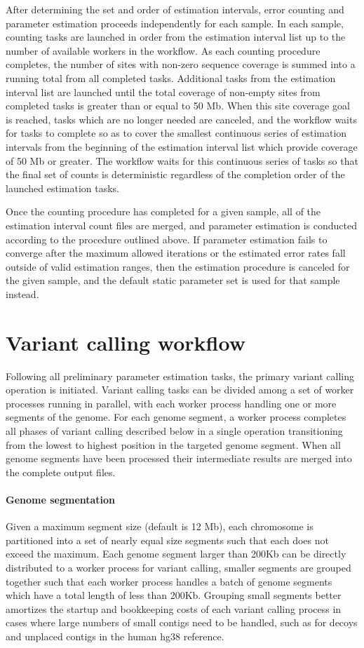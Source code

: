 \documentclass{article}
\begin{document}
After determining the set and order of estimation intervals, error counting and parameter estimation proceeds independently for each sample. In each sample, counting tasks are launched in order from the estimation interval list up to the number of available workers in the workflow. As each counting procedure completes, the number of sites with non-zero sequence coverage is summed into a running total from all completed tasks. Additional tasks from the estimation interval list are launched until the total coverage of non-empty sites from completed tasks is greater than or equal to 50 Mb. When this site coverage goal is reached, tasks which are no longer needed are canceled, and the workflow waits for tasks to complete so as to cover the smallest continuous series of estimation intervals from the beginning of the estimation interval list which provide coverage of 50 Mb or greater. The workflow waits for this continuous series of tasks so that the final set of counts is deterministic regardless of the completion order of the launched estimation tasks.

Once the counting procedure has completed for a given sample, all of the estimation interval count files are merged, and parameter estimation is conducted according to the procedure outlined above. If parameter estimation fails to converge after the maximum allowed iterations or the estimated error rates fall outside of valid estimation ranges, then the estimation procedure is canceled for the given sample, and the default static parameter set is used for that sample instead.

\section{Variant calling workflow}

Following all preliminary parameter estimation tasks, the primary variant calling operation is initiated. Variant calling tasks can be divided among a set of worker processes running in parallel, with each worker process handling one or more segments of the genome. For each genome segment, a worker process completes all phases of variant calling described below in a single operation transitioning from the lowest to highest position in the targeted genome segment. When all genome segments have been processed their intermediate results are merged into the complete output files.

\paragraph{Genome segmentation} Given a maximum segment size (default is 12 Mb), each chromosome is partitioned into a set of nearly equal size segments such that each does not exceed the maximum. Each genome segment larger than 200Kb can be directly distributed to a worker process for variant calling, smaller segments are grouped together such that each worker process handles a batch of genome segments which have a total length of less than 200Kb. Grouping small segments better amortizes the startup and bookkeeping costs of each variant calling process in cases where large numbers of small contigs need to be handled, such as for decoys and unplaced contigs in the human hg38 reference.
\end{document}
